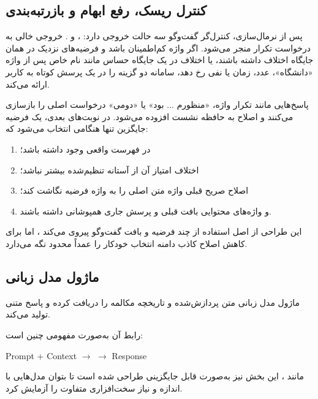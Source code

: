 \subsection{کنترل ریسک، رفع ابهام و بازرتبه‌بندی}

پس از نرمال‌سازی، کنترل‌گر گفت‌وگو سه حالت خروجی دارد:
،  و . خروجی خالی به درخواست تکرار
منجر می‌شود. اگر واژه کم‌اطمینان باشد و فرضیه‌های نزدیک در همان
جایگاه اختلاف داشته باشند، یا اختلاف در یک جایگاه حساس مانند نام
خاص پس از واژه «دانشگاه»، عدد، زمان یا نفی رخ دهد، سامانه دو
گزینه را در یک پرسش کوتاه به کاربر ارائه می‌کند.

پاسخ‌هایی مانند تکرار واژه، «منظورم ... بود» یا «دومی» درخواست
اصلی را بازسازی می‌کنند و اصلاح به حافظه نشست افزوده می‌شود. در
نوبت‌های بعدی، یک فرضیه جایگزین تنها هنگامی انتخاب می‌شود که:

\begin{enumerate}
    \item در فهرست واقعی  وجود داشته باشد؛
    \item اختلاف امتیاز آن از آستانه تنظیم‌شده بیشتر نباشد؛
    \item اصلاح صریح قبلی واژه متن اصلی را به واژه فرضیه نگاشت کند؛
    \item و واژه‌های محتوایی بافت قبلی و پرسش جاری همپوشانی داشته باشند.
\end{enumerate}

این طراحی از اصل استفاده از چند فرضیه و بافت گفت‌وگو پیروی می‌کند
\cite{baumann2009nbest,raux2010dynamic}، اما برای کاهش اصلاح کاذب
دامنه انتخاب خودکار را عمداً محدود نگه می‌دارد.


\subsection{ماژول مدل زبانی}

ماژول مدل زبانی متن پردازش‌شده و تاریخچه مکالمه را دریافت کرده
و پاسخ متنی تولید می‌کند.

رابط آن به‌صورت مفهومی چنین است:

\begin{center}
Prompt + Context
$\longrightarrow$
$\longrightarrow$
Response 
\end{center}

مانند ، این بخش نیز به‌صورت قابل جایگزینی طراحی شده است
تا بتوان مدل‌هایی با اندازه و نیاز سخت‌افزاری متفاوت را
آزمایش کرد.


